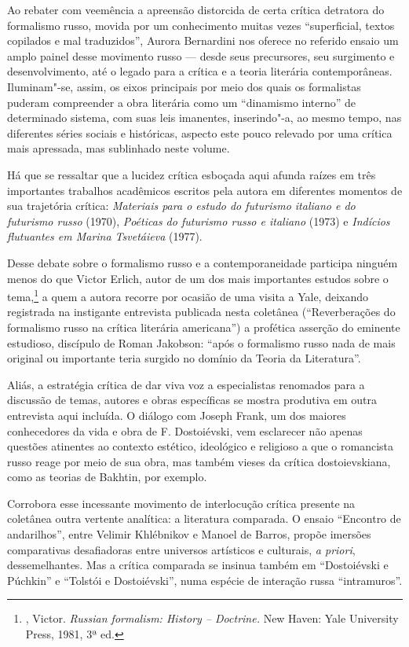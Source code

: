 Ao rebater com veemência a apreensão distorcida de certa crítica
detratora do formalismo russo, movida por um
conhecimento muitas vezes ``superficial, textos copilados e mal
traduzidos'', Aurora Bernardini nos oferece no referido ensaio um amplo painel desse movimento
russo --- desde seus precursores, seu surgimento e desenvolvimento, até o
legado para a crítica e a teoria literária contemporâneas. Iluminam"-se,
assim, os eixos principais por meio dos quais os formalistas
puderam compreender a obra literária como um ``dinamismo interno'' de
determinado sistema, com suas leis imanentes, inserindo"-a, ao mesmo
tempo, nas diferentes séries sociais e históricas, aspecto este pouco
relevado por uma crítica mais apressada, mas sublinhado neste volume.

Há que se ressaltar que a lucidez crítica esboçada aqui
afunda raízes em três importantes trabalhos acadêmicos
escritos pela autora em diferentes momentos de sua trajetória crítica:
\emph{Materiais para o estudo do futurismo italiano e do futurismo russo}
(1970), \emph{Poéticas do futurismo russo e italiano} (1973) e
\emph{Indícios flutuantes em Marina Tsvetáieva} (1977).

Desse debate sobre o formalismo russo e a
contemporaneidade participa ninguém menos do que Victor Erlich, autor de
um dos mais importantes estudos sobre o tema,\footnote{\scalebox{0.8}{ERLICH}, Victor. \emph{Russian
 formalism: History -- Doctrine.} New Haven: Yale University Press,
 1981, 3ª ed.} a quem a autora recorre por ocasião de uma visita
a Yale, deixando registrada na instigante entrevista publicada nesta
coletânea (``Reverberações do formalismo russo na crítica literária 
americana'') a profética asserção do eminente estudioso, discípulo de Roman
Jakobson: ``após o formalismo russo nada de mais original ou importante
teria surgido no domínio da Teoria da Literatura''.

Aliás, a estratégia crítica de dar viva voz a especialistas renomados
para a discussão de temas, autores e obras específicas se mostra
produtiva em outra entrevista aqui incluída. O diálogo com Joseph Frank,
um dos maiores conhecedores da vida e obra de F. Dostoiévski, vem
esclarecer não apenas questões atinentes ao contexto estético,
ideológico e religioso a que o romancista russo reage por meio de sua
obra, mas também vieses da crítica dostoievskiana, como as teorias de
Bakhtin, por exemplo.

Corrobora esse incessante movimento de interlocução crítica presente na
coletânea outra vertente analítica: a literatura comparada. O
ensaio ``Encontro de andarilhos'', entre Velimir Khlébnikov e Manoel
de Barros, propõe imersões comparativas desafiadoras entre universos
artísticos e culturais, \emph{a priori}, dessemelhantes. Mas a crítica
comparada se insinua também em ``Dostoiévski e Púchkin'' e ``Tolstói e
Dostoiévski'', numa espécie de interação russa
``intramuros''.

